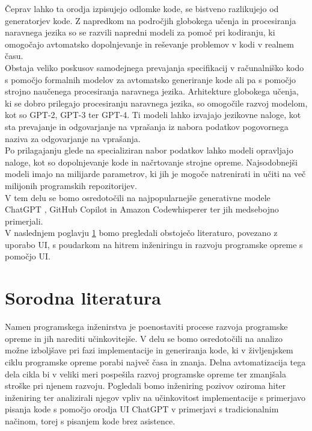\documentclass[a4paper,12pt,openright]{book}
\begin{document}
Čeprav lahko ta orodja izpisujejo odlomke kode, se bistveno razlikujejo od generatorjev kode.
Z napredkom na področjih globokega učenja in procesiranja naravnega jezika so se razvili napredni modeli za pomoč pri kodiranju, ki omogočajo avtomatsko dopolnjevanje in reševanje problemov v kodi v realnem času. \\
Obstaja veliko poskusov samodejnega prevajanja specifikacij v računalniško kodo s pomočjo formalnih modelov za avtomatsko generiranje kode ali pa s pomočjo strojno naučenega procesiranja naravnega jezika. Arhitekture globokega učenja, ki se dobro prilegajo procesiranju naravnega jezika, so omogočile razvoj modelom, kot so GPT-2, GPT-3 ter GPT-4. Ti modeli lahko izvajajo jezikovne naloge, kot sta prevajanje in odgovarjanje na vprašanja iz nabora podatkov pogovornega naziva za odgovarjanje na vprašanja. \cite{hu2019re} \\
Po prilagajanju glede na specializiran nabor podatkov lahko modeli opravljajo naloge, kot so dopolnjevanje kode in načrtovanje strojne opreme.  Najsodobnejši modeli imajo na milijarde parametrov, ki jih je mogoče natrenirati in učiti na več milijonih programskih repozitorijev.  \cite{hu2019re} \\
V tem delu se bomo osredotočili na najpopularnejše generativne modele ChatGPT \cite{openai_chatgpt}, GitHub Copilot \cite{github_copilot} in Amazon Codewhisperer \cite{saasworthy_codewhisperer} ter jih medsebojno primerjali. \\
\pagebreak
V naslednjem poglavju \ref{char:lit} bomo pregledali obstoječo literaturo, povezano z uporabo UI, s poudarkom na hitrem inženiringu in razvoju programske opreme s pomočjo UI. 
\section{Sorodna literatura} \label{char:lit}

Namen programskega inženirstva je poenostaviti procese razvoja programske opreme in jih narediti učinkovitejše. 
V delu se bomo osredotočili na analizo možne izboljšave pri fazi implementacije in generiranja kode, ki v življenjskem ciklu programske opreme porabi največ časa in znanja. Delna avtomatizacija tega dela cikla bi v veliki meri pospešila razvoj programske opreme ter zmanjšala stroške pri njenem razvoju. Pogledali bomo inženiring pozivov oziroma hiter inženiring ter analizirali njegov vpliv na učinkovitost implementacije s primerjavo pisanja kode s pomočjo orodja UI ChatGPT v primerjavi s tradicionalnim načinom, torej s pisanjem kode brez asistence. 
\end{document}
